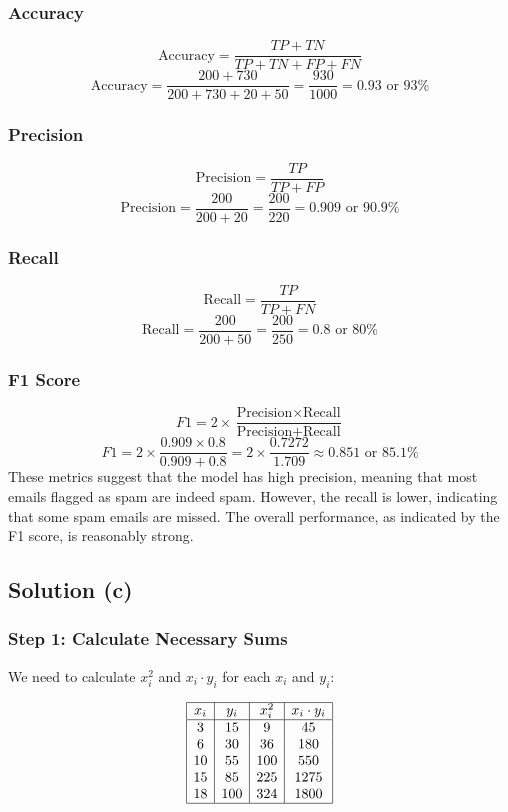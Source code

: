 \documentclass{article}
\begin{document}
\subsubsection*{Accuracy}
\[
\text{Accuracy} = \frac{TP + TN}{TP + TN + FP + FN}
\]
\[
\text{Accuracy} = \frac{200 + 730}{200 + 730 + 20 + 50} = \frac{930}{1000} = 0.93 \text{ or } 93\%
\]

\subsubsection*{Precision}
\[
\text{Precision} = \frac{TP}{TP + FP}
\]
\[
\text{Precision} = \frac{200}{200 + 20} = \frac{200}{220} = 0.909 \text{ or } 90.9\%
\]

\subsubsection*{Recall}
\[
\text{Recall} = \frac{TP}{TP + FN}
\]
\[
\text{Recall} = \frac{200}{200 + 50} = \frac{200}{250} = 0.8 \text{ or } 80\%
\]

\subsubsection*{F1 Score}
\[
F1 = 2 \times \frac{\text{Precision} \times \text{Recall}}{\text{Precision} + \text{Recall}}
\]
\[
F1 = 2 \times \frac{0.909 \times 0.8}{0.909 + 0.8} = 2 \times \frac{0.7272}{1.709} \approx 0.851 \text{ or } 85.1\%
\]
\vspace{1pt}
\hspace{-5pt}
These metrics suggest that the model has high precision, meaning that most emails flagged as spam are indeed spam. However, the recall is lower, indicating that some spam emails are missed. The overall performance, as indicated by the F1 score, is reasonably strong.


\vspace{10pt}
\subsection*{Solution (c)}
\subsubsection*{Step 1: Calculate Necessary Sums}

We need to calculate $x_i^2$ and $x_i \cdot y_i$ for each $x_i$ and $y_i$:

\[
\begin{array}{|c|c|c|c|}
\hline
x_i & y_i & x_i^2 & x_i \cdot y_i \\
\hline
3 & 15 & 9 & 45 \\
6 & 30 & 36 & 180 \\
10 & 55 & 100 & 550 \\
15 & 85 & 225 & 1275 \\
18 & 100 & 324 & 1800 \\
\hline
\end{array}
\]
\end{document}
